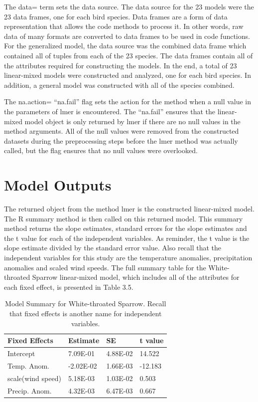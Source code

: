 The data= term sets the data source. The data source for the 23 models were the 23 data frames, one for each bird species. Data frames are a form of data representation that allows the code methods to process it. In other words, raw data of many formats are converted to data frames to be used in code functions. For the generalized model, the data source was the combined data frame which contained all of tuples from each of the 23 species. The data frames contain all of the attributes required for constructing the models. In the end, a total of 23 linear-mixed models were constructed and analyzed, one for each bird species. In addition, a general model was constructed with all of the species combined.

The na.action= ``na.fail'' flag sets the action for the method when a null value in the parameters of lmer is encountered. The ``na.fail'' ensures that the linear-mixed model object is only returned by lmer if there are no null values in the method arguments. All of the null values were removed from the constructed datasets during the preprocessing steps before the lmer method was actually called, but the flag ensures that no null values were overlooked.   

\section{Model Outputs}

The returned object from the method lmer is the constructed linear-mixed model. The R summary method is then called on this returned model. This summary method returns the slope estimates, standard errors for the slope estimates and the t value for each of the independent variables. As reminder, the t value is the slope estimate divided by the standard error value. Also recall that the independent variables for this study are the temperature anomalies, precipitation anomalies and scaled wind speeds. The full summary table for the White-throated Sparrow linear-mixed model, which includes all of the attributes for each fixed effect, is presented in Table 3.5.

\begin{longtable}[c]{|l|l|l|l|}
\caption{Model Summary for White-throated Sparrow. Recall that fixed effects is another name for independent variables.}
\label{my-label}\\
\hline
Fixed Effects     & Estimate  & SE       & t value \\ \hline
\endhead
%
Intercept         & 7.09E-01  & 4.88E-02 & 14.522  \\ \hline
Temp. Anom.       & -2.02E-02 & 1.66E-03 & -12.183 \\ \hline
scale(wind speed) & 5.18E-03  & 1.03E-02 & 0.503   \\ \hline
Precip. Anom.     & 4.32E-03  & 6.47E-03 & 0.667   \\ \hline
\end{longtable}

